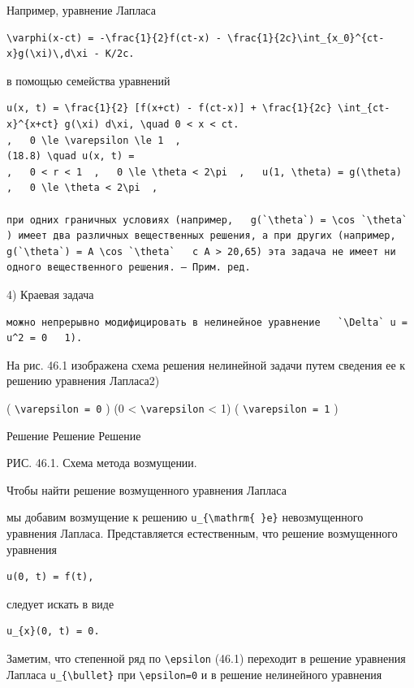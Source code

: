 \documentclass[
  ukrainian,
]{article}
\begin{document}
Например, уравнение Лапласа

\begin{verbatim}
\varphi(x-ct) = -\frac{1}{2}f(ct-x) - \frac{1}{2c}\int_{x_0}^{ct-x}g(\xi)\,d\xi - K/2c.
\end{verbatim}

в помощью семейства уравнений

\begin{verbatim}
u(x, t) = \frac{1}{2} [f(x+ct) - f(ct-x)] + \frac{1}{2c} \int_{ct-x}^{x+ct} g(\xi) d\xi, \quad 0 < x < ct.
,   0 \le \varepsilon \le 1  ,
(18.8) \quad u(x, t) =
,   0 < r < 1  ,   0 \le \theta < 2\pi  ,   u(1, \theta) = g(\theta)  ,   0 \le \theta < 2\pi  ,

при одних граничных условиях (например,   g(`\theta`) = \cos `\theta`  ) имеет два различных вещественных решения, а при других (например,   g(`\theta`) = A \cos `\theta`   с A > 20,65) эта задача не имеет ни одного вещественного решения. — Прим. ред.
\end{verbatim}

4) Краевая задача

\begin{verbatim}
можно непрерывно модифицировать в нелинейное уравнение   `\Delta` u = u^2 = 0   1).
\end{verbatim}

На рис. 46.1 изображена схема решения нелинейной задачи путем сведения
ее к решению уравнения Лапласа2)

( \texttt{\textbackslash{}varepsilon\ =\ 0} ) (0 \textless{}
\texttt{\textbackslash{}varepsilon} \textless{} 1) (
\texttt{\textbackslash{}varepsilon\ =\ 1} )

Решение Решение Решение

РИС. 46.1. Схема метода возмущении.

Чтобы найти решение возмущенного уравнения Лапласа

мы добавим возмущение к решению
\texttt{u\_\{\textbackslash{}mathrm\{\ \}e\}} невозмущенного уравнения
Лапласа. Представляется естественным, что решение возмущенного уравнения

\begin{verbatim}
u(0, t) = f(t),
\end{verbatim}

следует искать в виде

\begin{verbatim}
u_{x}(0, t) = 0.
\end{verbatim}

Заметим, что степенной ряд по \texttt{\textbackslash{}epsilon} (46.1)
переходит в решение уравнения Лапласа
\texttt{u\_\{\textbackslash{}bullet\}} при
\texttt{\textbackslash{}epsilon=0} и в решение нелинейного уравнения
\end{document}
